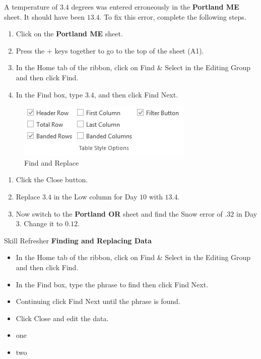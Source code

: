 A temperature of $ 3.4 $ degrees was entered erroneously in the \textbf{Portland ME} sheet. It should have been $ 13.4 $. To fix this error, complete the following steps.

\begin{enumerate}
	\item Click on the \textbf{Portland ME} sheet.
	\item Press the + keys together to go to the top of the sheet (\textsf{A1}).
	\item In the Home tab of the ribbon, click on Find \& Select in the Editing Group and then click Find.
	\item In the Find box, type $ 3.4 $, and then click Find Next.
\end{enumerate}

\begin{figure}[H]
	\centering
	\includegraphics[width=\maxwidth{.95\linewidth}]{gfx/ch05_fig05}
	\caption{Find and Replace}
	\label{05:fig06}
\end{figure}

\begin{enumerate}
	\item Click the Close button.
	\item Replace $ 3.4 $ in the Low column for Day $ 10 $ with $ 13.4 $.
	\item Now switch to the \textbf{Portland OR} sheet and find the Snow error of $ .32 $ in Day $ 3 $. Change it to $ 0.12 $. 
\end{enumerate}

\begin{center}
	\begin{sklbox}{Skill Refresher}
		\textbf{Finding and Replacing Data}
		\\
		\begin{itemize}
			\setlength{\itemsep}{0pt}
			\setlength{\parskip}{0pt}
			\setlength{\parsep}{0pt}

			\item In the Home tab of the ribbon, click on Find \& Select in the Editing Group and then click Find.
			\item In the Find box, type the phrase to find then click Find Next.
			\item Continuing click Find Next until the phrase is found.
			\item Click Close and edit the data.
			
			\item one
			\item two
			
		\end{itemize}
	\end{sklbox}
\end{center}

